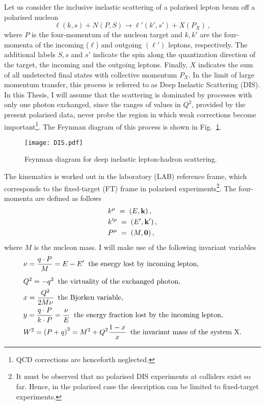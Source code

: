 Let us consider the inclusive inelastic scattering of a polarised lepton beam off a polarised nucleon
\begin{equation}
    \ell(k,s) + N(P, S) \longrightarrow \ell'(k',s') + X(P_X) \,,
    \label{eq:DIS}
\end{equation}
where $P$ is the four-momentum of the nucleon target and $k,k'$ are the four-momenta of the incoming ($\ell$) and outgoing $(\ell')$ leptons, respectively. The additional labels $S,s$ and $s'$ indicate the spin along the quantization direction of the target, the incoming and the outgoing leptons. Finally, $X$ indicates the sum of all undetected final states with collective momentum $P_X$. In the limit of large momentum transfer, this process is referred to as Deep Inelastic Scattering (DIS). In this Thesis, I will assume that the scattering is dominated by processes with only one photon exchanged, since the ranges of values in $Q^2$, provided by the present polarised data, never probe the region in which weak corrections become important\footnote{QCD corrections are henceforth neglected.}. The Feynman diagram of this process is shown in Fig.~\ref{fig:DIS_Feynamn}.
\begin{figure}[t]
  \centering
  \texttt{[image: DIS.pdf]} 
  \caption{Feynman diagram for deep inelastic lepton-hadron scattering.}
  \label{fig:DIS_Feynamn}
\end{figure}
The kinematics is worked out in the laboratory (LAB) reference frame, which corresponds to the fixed-target (FT) frame in polarised experiments\footnote{\footnotesize It must be observed that no polarised DIS experiments at colliders exist so far. Hence, in the polarised case the description can be limited to fixed-target experiments.}. The four-momenta are defined as follows
\begin{equation}
    \begin{split}
        &k^{\mu} \;=\; \left(E, \vb{k} \right), \\
        &k'^{\mu} \;=\; \left(E', \vb{k'} \right), \\
        &P^{\mu} \;=\; \left(M, \vb{0} \right),
    \end{split}
\end{equation}
where $M$ is the nucleon mass. I will make use of the following invariant variables
\begin{align}
        & \nu = \frac{q \cdot P}{M} = E - E' \;\; \textrm{the energy lost by incoming lepton},
        \label{eq:nu}\\[5pt]
        & Q^2 = - q^2 \;\; \textrm{the virtuality of the exchanged photon},
        \label{eq:Q2}\\
        & x=\frac{Q^2}{2M\nu} \;\; \textrm{the Bjorken variable},
        \label{eq:x}\\
        & y = \frac{q\cdot P}{k \cdot P} = \frac{\nu}{E} \; \; \textrm{the energy fraction lost by the incoming lepton},
        \label{eq:y}\\
        & W^2 = \qty(P + q)^2 = M^2 + Q^2 \frac{1-x}{x} \;\; \textrm{the invariant mass of the system X}.
        \label{eq:W2}
\end{align}
